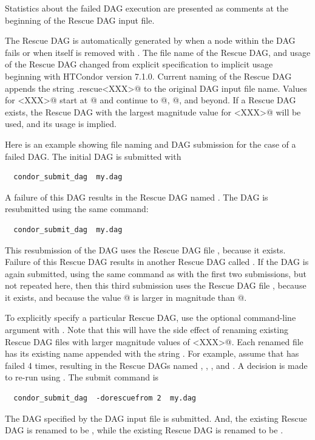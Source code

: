 Statistics about the failed DAG execution are presented as
comments at the beginning of the Rescue DAG input file.

The Rescue DAG is automatically generated by  when a node
within the DAG fails or when  itself is removed
with .
The file name of the Rescue DAG, and usage of the Rescue
DAG changed from explicit specification to implicit usage
beginning with HTCondor version 7.1.0.
Current naming of the Rescue DAG appends the string
\verb@.rescue<XXX>@ to the original DAG input file name.
Values for \verb@<XXX>@ start at @ and continue
to @, @, and beyond.
If a Rescue DAG exists,
the Rescue DAG with the largest magnitude value for \verb@<XXX>@
will be used, and its usage is implied.

Here is an example showing file naming and DAG submission
for the case of a failed DAG.
The initial DAG is submitted with
\begin{verbatim}
  condor_submit_dag  my.dag
\end{verbatim}
A failure of this DAG results in the Rescue DAG
named .
The DAG is resubmitted using the same command: 
\begin{verbatim}
  condor_submit_dag  my.dag
\end{verbatim}
This resubmission of the DAG uses the Rescue DAG file ,
because it exists.
Failure of this Rescue DAG results in another Rescue DAG
called .
If the DAG is again submitted, using the same command
as with the first two submissions, but not repeated here,
then this third submission uses the Rescue DAG file ,
because it exists, and because the value @ is larger
in magnitude than @.

To explicitly specify a particular Rescue DAG,
use the optional command-line argument 
with .
Note that this will have the side effect of renaming 
existing Rescue DAG files with larger magnitude values 
of \verb@<XXX>@.
Each renamed file has its existing name appended with
the string .
For example, assume that  has failed 4 times,
resulting in the Rescue DAGs named
,
,
,
and
.
A decision is made to re-run using .
The submit command is
\begin{verbatim}
  condor_submit_dag  -dorescuefrom 2  my.dag
\end{verbatim}
The DAG specified by the DAG input file 
is submitted.
And, the existing Rescue DAG  is
renamed to be ,
while the existing Rescue DAG  is
renamed to be .

